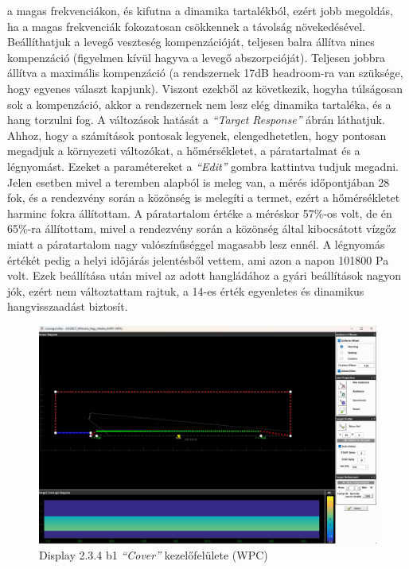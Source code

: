 a magas frekvenciákon, és kifutna a dinamika tartalékból, ezért jobb megoldás, ha a magas frekvenciák fokozatosan csökkennek a távolság növekedésével.
Beállíthatjuk a levegő veszteség kompenzációját, teljesen balra állítva nincs kompenzáció (figyelmen kívül hagyva a levegő abszorpcióját).
Teljesen jobbra állítva a maximális kompenzáció (a rendszernek 17dB headroom-ra van szüksége, hogy egyenes választ kapjunk).
Viszont ezekből az következik, hogyha túlságosan sok a kompenzáció, akkor a rendszernek nem lesz elég dinamika tartaléka, és a hang torzulni fog.
A változások hatását a \textit{``Target Response''} ábrán láthatjuk.
Ahhoz, hogy a számítások pontosak legyenek, elengedhetetlen, hogy pontosan megadjuk a környezeti változókat,
a hőmérsékletet, a páratartalmat és a légnyomást. Ezeket a paramétereket a \textit{``Edit''} gombra kattintva tudjuk megadni.
Jelen esetben mivel a teremben alapból is meleg van, a mérés időpontjában 28 fok, és a rendezvény során a közönség is melegíti a termet,
ezért a hőmérsékletet harminc fokra állítottam.
A páratartalom értéke a méréskor 57\%-os volt, de én 65\%-ra állítottam, mivel a rendezvény során a közönség által kibocsátott
vízgőz miatt a páratartalom nagy valószínűséggel magasabb lesz ennél. A légnyomás értékét pedig a helyi időjárás jelentésből vettem, ami
azon a napon 101800 Pa volt. Ezek beállítása után mivel az adott hangládához a gyári beállítások nagyon jók, ezért nem változtattam rajtuk,
a 14-es érték egyenletes és dinamikus hangvisszaadást biztosít.
\begin{figure}[H]
	\centering
	\includegraphics[width=\textwidth, keepaspectratio]{figures/display_wpc_2.jpg}
	\caption{Display 2.3.4 b1 \textit{``Cover''} kezelőfelülete (WPC)}\label{fig:display_wpc_2}
\end{figure}
